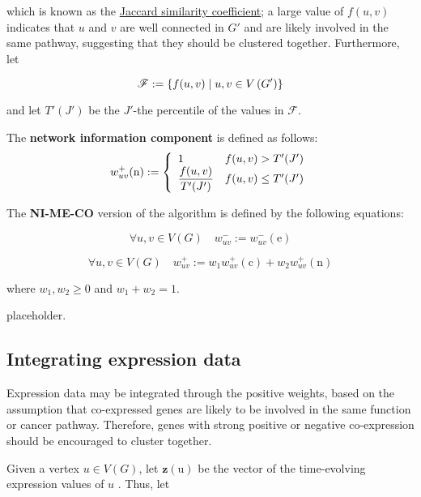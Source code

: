 which is known as the \href{https://en.wikipedia.org/wiki/Jaccard_index}{Jaccard similarity coefficient}; a large value of $f(u, v)$ indicates that $u$ and $v$ are well connected in $G'$ and are likely involved in the same pathway, suggesting that they should be clustered together. Furthermore, let

\begin{equation}
    \mathscr{F} := \{f(u, v) \mid u, v \in V\rbk{G'}\}
\end{equation}

and let $T'(J')$ be the $J'$-the percentile of the values in $\mathscr F$.

\begin{definition}
    The \textbf{network information component} is defined as follows: $$w_{uv}^+(\mathrm n) := \soe{ll}{1 & f(u, v) > T'(J') \\ \dfrac{f(u, v)}{T'(J')} & f(u, v) \le T'(J')}$$
\end{definition}

\begin{definition}[NI-ME-CO]
    The \textbf{NI-ME-CO} version of the algorithm is defined by the following equations:

    \begin{equation}
        \forall u, v \in V(G) \quad w_{uv}^- := w_{uv}^-(\mathrm e)
    \end{equation}

    \begin{equation}
        \forall u, v \in V(G) \quad w_{uv}^+ := w_1 w_{uv}^+(\mathrm c) + w_2 w_{uv}^+(\mathrm n)
    \end{equation}

    where $w_1, w_2 \ge 0$ and $w_1 + w_2 = 1$.
\end{definition}

placeholder. 

\subsection{Integrating expression data}

Expression data may be integrated through the positive weights, based on the assumption that co-expressed genes are likely to be involved in the same function or cancer pathway. Therefore, genes with strong positive or negative co-expression should be encouraged to cluster together.

Given a vertex $u \in V(G)$, let $\mathrm {\mathbf z(u)}$ be the vector of the time-evolving expression values of $u$ . Thus, let


